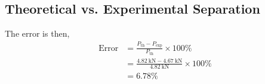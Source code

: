 \subsection{Theoretical vs. Experimental Separation}
The error is then,
\begin{align*}
    \text{Error} &= \frac{P_{\text{th}} - P_{\text{exp}}}{P_{\text{th}}} \times 100\% \\
    &= \frac{\qty{4.82}{\kilo\newton} - \qty{4.67}{\kilo\newton}}{\qty{4.82}{\kilo\newton}} \times 100\% \\
    &= \boxed{6.78\%}
\end{align*}